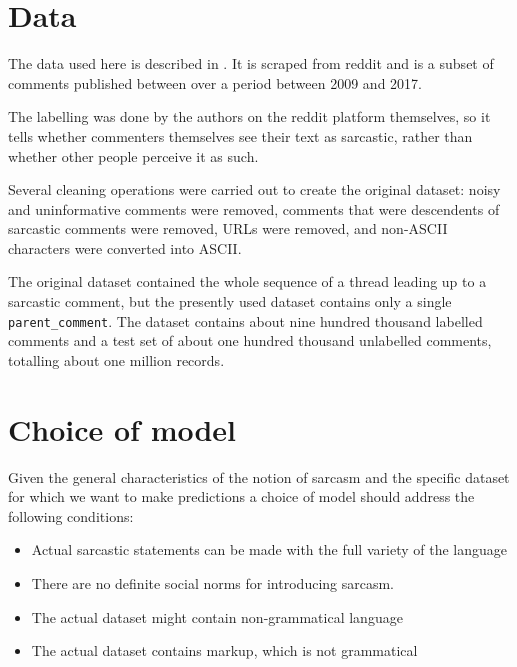 \documentclass[11pt,a4paper]{article}
\begin{document}
\section{Data}

The data used here is described in \cite{khodak-etal-2018-large}.  It is scraped from reddit and is a subset of comments published between over a period between 2009 and 2017.\par

The labelling was done by the authors on the reddit platform themselves, so it tells whether commenters themselves see their text as sarcastic, rather than whether other people perceive it as such.\par  

Several cleaning operations were carried out to create the original dataset: noisy and uninformative comments were removed,  comments that were descendents of sarcastic comments were removed, URLs were removed, and non-ASCII characters were converted into ASCII. \par
The original dataset contained the whole sequence of a thread leading up to a sarcastic comment, but the presently used dataset contains only a single \texttt{parent\_comment}. The dataset contains about nine hundred thousand labelled comments and a test set of about one hundred thousand unlabelled comments, totalling about one million records.\par 


\section{Choice of model}

Given the general characteristics of the notion of sarcasm and the specific dataset for which we want to make predictions a choice of model should address the following conditions:

\begin{itemize}
\item{Actual sarcastic statements can be made with the full variety of the language}
\item{There are no definite social norms for introducing sarcasm.}
\item{The actual dataset might contain non-grammatical language}
\item{The actual dataset contains markup, which is not grammatical}
\end{itemize}
\end{document}
